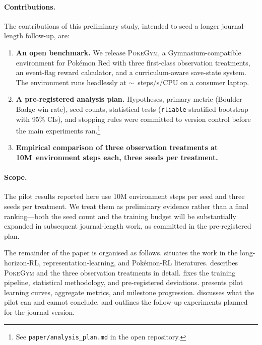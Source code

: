 \paragraph{Contributions.}
The contributions of this preliminary study, intended to seed a longer
journal-length follow-up, are:
\begin{enumerate}
\item \textbf{An open benchmark.}  We release \textsc{PokeGym}, a
  Gymnasium-compatible~\citep{gymnasium} environment for Pok\'emon Red
  with three first-class observation treatments, an event-flag reward
  calculator, and a curriculum-aware save-state system.  The
  environment runs headlessly at $\sim$~steps/s/CPU on a
  consumer laptop.
\item \textbf{A pre-registered analysis plan.}  Hypotheses, primary
  metric (Boulder Badge win-rate), seed counts, statistical tests
  (\texttt{rliable} stratified bootstrap with 95\% CIs), and stopping
  rules were committed to version control before the main experiments
  ran.\footnote{See \texttt{paper/analysis\_plan.md} in the open
    repository.}
\item \textbf{Empirical comparison of three observation treatments at
  10M~environment steps each, three seeds per treatment.}
\end{enumerate}

\paragraph{Scope.}
The pilot results reported here use 10M environment steps per seed and
three seeds per treatment.  We treat them as preliminary evidence
rather than a final ranking---both the seed count and the training
budget will be substantially expanded in subsequent journal-length
work, as committed in the pre-registered plan.

The remainder of the paper is organised as follows.
 situates the work in the long-horizon-RL,
representation-learning, and Pok\'emon-RL literatures.
 describes \textsc{PokeGym} and the three
observation treatments in detail.   fixes the
training pipeline, statistical methodology, and pre-registered
deviations.   presents pilot learning curves,
aggregate metrics, and milestone progression.  
discusses what the pilot can and cannot conclude, and outlines the
follow-up experiments planned for the journal version.
